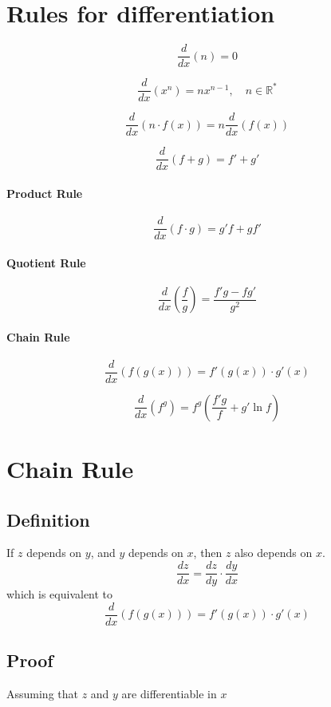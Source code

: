 \documentclass{article}
\begin{document}
\pagebreak

\section{Rules for differentiation}

\[
    \frac{d}{dx}(n)=0
\]

\[
    \frac{d}{dx}(x^n)=nx^{n-1},\quad n\in\mathbb{R}^*
\]

\[
    \frac{d}{dx}\left(n\cdot f(x)\right)=n\frac{d}{dx}\left(f(x)\right)
\]

\[
    \frac{d}{dx}(f+g)=f'+g'
\]

\paragraph{Product Rule}
\[
    \frac{d}{dx}(f\cdot g)=g'f+gf'
\]

\paragraph{Quotient Rule}
\[
    \frac{d}{dx}\left(\frac{f}{g}\right)=\frac{f'g-fg'}{g^2}
\]

\paragraph{Chain Rule}
\[
    \frac{d}{dx}(f(g(x)))=f'(g(x))\cdot g'(x)
\]

\[
    \frac{d}{dx}(f^g)=f^g\left(\frac{f'g}{f}+g'\ln f\right)
\]

\pagebreak

\section{Chain Rule}

\subsection{Definition}

If \(z\) depends on \(y\), and \(y\) depends on \(x\), then \(z\) also depends on \(x\).
\[
    \frac{dz}{dx}=\frac{dz}{dy}\cdot\frac{dy}{dx}
\]
which is equivalent to
\[
    \frac{d}{dx}(f(g(x)))=f'(g(x))\cdot g'(x)
\]

\subsection{Proof}

Assuming that \(z\) and \(y\) are differentiable in \(x\)
\end{document}
